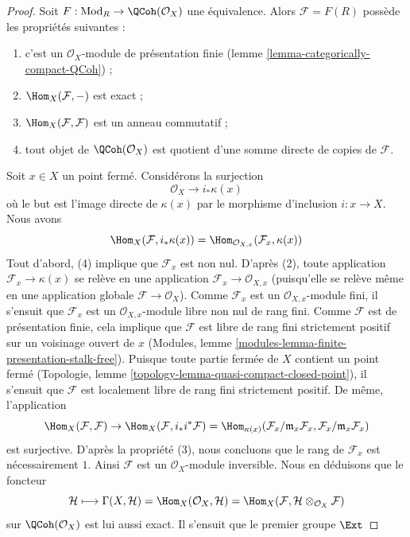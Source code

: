 \begin{proof}
Soit $F : \text{Mod}_R \to \QCoh(\mathcal{O}_X)$ une équivalence.
Alors $\mathcal{F} = F(R)$ possède les propriétés suivantes :
\begin{enumerate}
\item c'est un $\mathcal{O}_X$-module de présentation finie
(lemme \ref{lemma-categorically-compact-QCoh}) ;
\item $\Hom_X(\mathcal{F}, -)$ est exact ;
\item $\Hom_X(\mathcal{F}, \mathcal{F})$ est un anneau commutatif ;
\item tout objet de $\QCoh(\mathcal{O}_X)$ est quotient d'une somme directe
de copies de $\mathcal{F}$.
\end{enumerate}
Soit $x \in X$ un point fermé. Considérons la surjection
$$
\mathcal{O}_X \to i_*\kappa(x)
$$
où le but est l'image directe de $\kappa(x)$ par le morphisme d'inclusion
$i : x \to X$. Nous avons
$$
\Hom_X(\mathcal{F}, i_*\kappa(x)) =
\Hom_{\mathcal{O}_{X, x}}(\mathcal{F}_x, \kappa(x))
$$
Tout d'abord, (4) implique que $\mathcal{F}_x$ est non nul.
D'après (2), toute application $\mathcal{F}_x \to \kappa(x)$ se relève en
une application $\mathcal{F}_x \to \mathcal{O}_{X, x}$ (puisqu'elle se
relève même en une application globale $\mathcal{F} \to \mathcal{O}_X$).
Comme $\mathcal{F}_x$ est un $\mathcal{O}_{X, x}$-module fini, il s'ensuit
que $\mathcal{F}_x$ est un $\mathcal{O}_{X, x}$-module libre non nul de rang fini.
Comme $\mathcal{F}$ est de présentation finie, cela implique que
$\mathcal{F}$ est libre de rang fini strictement positif sur un voisinage ouvert de $x$
(Modules, lemme \ref{modules-lemma-finite-presentation-stalk-free}).
Puisque toute partie fermée de $X$ contient un point fermé
(Topologie, lemme \ref{topology-lemma-quasi-compact-closed-point}),
il s'ensuit que $\mathcal{F}$ est localement libre de rang fini strictement positif.
De même, l'application
$$
\Hom_X(\mathcal{F}, \mathcal{F}) \to
\Hom_X(\mathcal{F}, i_*i^*\mathcal{F}) =
\Hom_{\kappa(x)}(\mathcal{F}_x/\mathfrak m_x \mathcal{F}_x,
\mathcal{F}_x/\mathfrak m_x \mathcal{F}_x)
$$
est surjective. D'après la propriété (3), nous concluons que le rang de
$\mathcal{F}_x$ est nécessairement $1$. Ainsi $\mathcal{F}$ est un
$\mathcal{O}_X$-module inversible. Nous en déduisons que le foncteur
$$
\mathcal{H}
\longmapsto
\Gamma(X, \mathcal{H}) = \Hom_X(\mathcal{O}_X, \mathcal{H}) =
\Hom_X(\mathcal{F}, \mathcal{H} \otimes_{\mathcal{O}_X} \mathcal{F})
$$
sur $\QCoh(\mathcal{O}_X)$ est lui aussi exact. Il s'ensuit que le premier
groupe $\Ext$

\end{proof}
